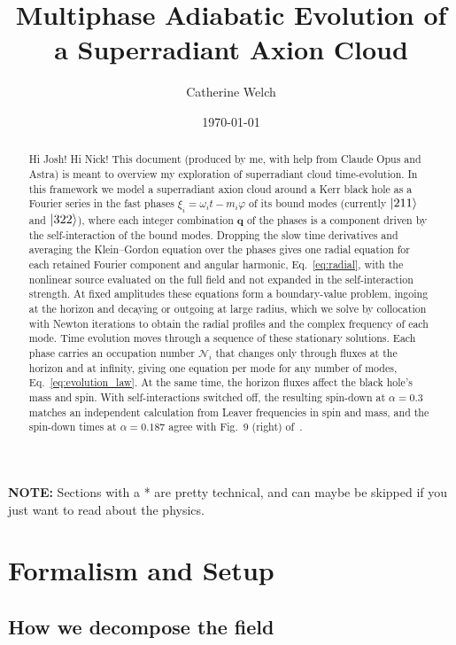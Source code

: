 \documentclass[11pt]{article}
\title{Multiphase Adiabatic Evolution of a Superradiant Axion Cloud}
\author{Catherine Welch}
\date{\today}
\newcommand{\ON}[1]{ \textcolor{violet}{(ON: #1)} }
\begin{document}
\maketitle

\begin{abstract}
    Hi Josh! Hi Nick! This document (produced by me, with help from Claude Opus and Astra) is meant to overview my exploration of superradiant cloud time-evolution. In this framework we model a superradiant axion cloud around a Kerr black hole as a Fourier series in the fast phases $\xi_i = \omega_i t - m_i\varphi$ of its bound modes (currently $\ket{211}$ and $\ket{322}$), where each integer combination $\mathbf{q}$ of the phases is a component driven by the self-interaction of the bound modes. Dropping the slow time derivatives and averaging the Klein--Gordon equation over the phases gives one radial equation for each retained Fourier component and angular harmonic, Eq.~\eqref{eq:radial}, with the nonlinear source evaluated on the full field and not expanded in the self-interaction strength. At fixed amplitudes these equations form a boundary-value problem, ingoing at the horizon and decaying or outgoing at large radius, which we solve by collocation with Newton iterations to obtain the radial profiles and the complex frequency of each mode. Time evolution moves through a sequence of these stationary solutions. Each phase carries an occupation number $\mathcal{N}_i$ that changes only through fluxes at the horizon and at infinity, giving one equation per mode for any number of modes, Eq.~\eqref{eq:evolution_law}. At the same time, the horizon fluxes affect the black hole's mass and spin. With self-interactions switched off, the resulting spin-down at $\alpha=0.3$ matches an independent calculation from Leaver frequencies in spin and mass, and the spin-down times at $\alpha=0.187$ agree with Fig.~9 (right) of~\cite{Baryakhtar_2021}.
\end{abstract}

\textbf{NOTE:} Sections with a * are pretty technical, and can maybe be skipped if you just want to read about the physics.


\section{Formalism and Setup}
\subsection{How we decompose the field}
\end{document}
